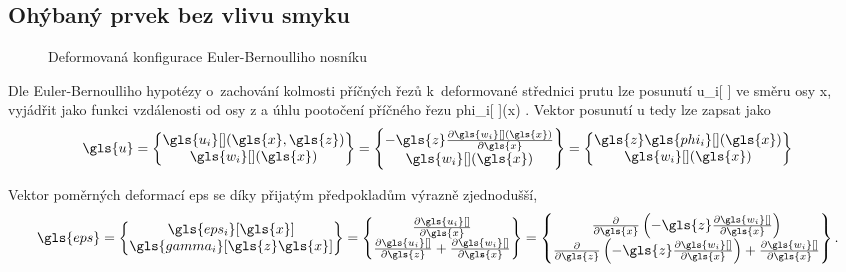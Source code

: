 \subsection{Ohýbaný prvek bez vlivu smyku} \label{sec:EB_beam}

\begin{figure}[H]
    
    \caption{Deformovaná konfigurace Euler-Bernoulliho nosníku}
    \label{fig:deformed_beam}
\end{figure}

Dle Euler-Bernoulliho hypotézy o~zachování kolmosti příčných řezů k~deformované střednici prutu lze posunutí \gls{u_i}[ ] ve směru osy \gls{x}, vyjádřit jako funkci vzdálenosti od osy \gls{z} a úhlu pootočení příčného řezu \gls{phi_i}[ ](\gls{x}) \cite[58]{ymkp}. Vektor posunutí \gls{u} tedy lze zapsat jako
\begin{equation}
    \gls{u} = 
    \begin{Bmatrix}
        \gls{u_i}[ ](\gls{x}, \gls{z}) \\
        \gls{w_i}[ ](\gls{x})
    \end{Bmatrix}
    =
    \begin{Bmatrix}
        -\gls{z} \pdv{\gls{w_i}[ ](\gls{x})}{\gls{x}} \\
        \gls{w_i}[ ](\gls{x})
    \end{Bmatrix}
    =
    \begin{Bmatrix}
        \gls{z} \gls{phi_i}[ ](\gls{x}) \\
        \gls{w_i}[ ](\gls{x})
    \end{Bmatrix}
\end{equation}

Vektor poměrných deformací \gls{eps} se díky přijatým předpokladům výrazně zjednodušší,
\begin{equation}
    \gls{eps}
    =
    \begin{Bmatrix}
        \gls{eps_i}[\gls{x}] \\
        \gls{gamma_i}[\gls{z}\gls{x}] \\
    \end{Bmatrix}
    =
    \begin{Bmatrix}
        \pdv{\gls{u_i}[ ]}{\gls{x}} \\
        \pdv{\gls{u_i}[ ]}{\gls{z}} + \pdv{\gls{w_i}[ ]}{\gls{x}} \\
    \end{Bmatrix}
    =
    \begin{Bmatrix}
        \pderivative{\gls{x}}\left( -\gls{z} \pdv{\gls{w_i}[ ]}{\gls{x}} \right) \\
        \pderivative{\gls{z}} \left( -\gls{z} \pdv{\gls{w_i}[ ]}{\gls{x}} \right) + \pdv{\gls{w_i}[ ]}{\gls{x}} \\
    \end{Bmatrix}.
\end{equation}

